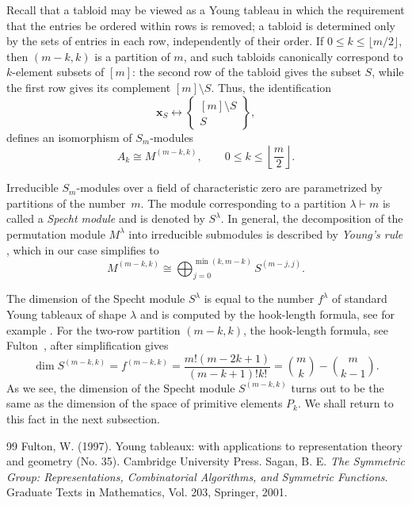 \documentclass[10pt,a4paper]{amsart}
\begin{document}
Recall that a tabloid may be viewed as a Young tableau in which the
requirement that the entries be ordered within rows is removed; a tabloid is
determined only by the sets of entries in each row, independently of their
order. If
$0\le k\le \lfloor m/2\rfloor$, then $(m-k,k)$ is a partition of $m$, and
such tabloids canonically correspond to $k$-element subsets of $[m]$: the
second row of the tabloid gives the subset $S$, while the first row gives its
complement $[m]\setminus S$. Thus, the identification
$$
\boldsymbol{x}_S
\longleftrightarrow
\left\{\begin{array}{c}
[m]\setminus S\\
S
\end{array}\right\},
$$
defines an isomorphism of $S_m$-modules
$$
A_k\cong M^{(m-k,k)},
\qquad 0\le k\le \left\lfloor \frac m2\right\rfloor.
$$

Irreducible $S_m$-modules over a field of characteristic zero are parametrized
by partitions of the number~$m$. The module corresponding to a partition
$\lambda \vdash m$ is called a \emph{Specht module} and is denoted by
$S^\lambda$.
In general, the decomposition of the permutation module $M^\lambda$ into
irreducible submodules is described by \emph{Young's rule}
\cite[Theorem~2.11.2]{Sagan}, which in our case simplifies to
$$
M^{(m-k,k)}
\cong
\bigoplus_{j=0}^{\min(k,m-k)}
S^{(m-j,j)}.
$$

The dimension of the Specht module $S^\lambda$ is equal to the number
$f^\lambda$ of standard Young tableaux of shape $\lambda$ and is computed by
the hook-length formula, see for example \cite[Section~4.3]{Sagan}.
For the two-row partition $(m-k,k)$, the hook-length formula, see
Fulton~\cite[Exercise~9]{Fulton1997}, after simplification gives
\begin{equation} \label{dim_S}
\dim S^{(m-k,k)}=f^{(m-k,k)}
=
\frac{m!(m-2k+1)}{(m-k+1)!k!}
=
\binom{m}{k}-\binom{m}{k-1}.
\end{equation}
As we see, the dimension of the Specht module $S^{(m-k,k)}$ turns out to be
the same as the dimension of the space of primitive elements $P_k$. We shall
return to this fact in the next subsection.


\begin{thebibliography}{99}
 Fulton, W. (1997). Young tableaux: with applications to representation theory and geometry (No. 35). Cambridge University Press.
 Sagan, B. E. \emph{The Symmetric Group: Representations, Combinatorial Algorithms, and Symmetric Functions}. Graduate Texts in Mathematics, Vol. 203, Springer, 2001.
\end{thebibliography}
\end{document}
